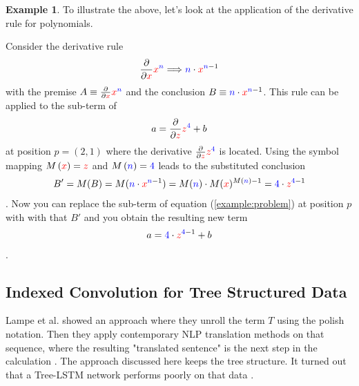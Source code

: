 \documentclass{scrartcl}
\theoremstyle{definition}
\newtheorem{exmp}{Example}[section]
\begin{document}
\begin{exmp}
To illustrate the above, let's look at the application of the derivative rule for polynomials.

Consider the derivative rule
\begin{align}
	\frac{\partial}{\partial {\color{red}x}} {\color{red}x}^{\color{blue}n} \Longrightarrow {\color{blue}n}\cdot {\color{red}x}^{{\color{blue}n}-1} 
\end{align}
with the premise $A\equiv \frac{\partial}{\partial {\color{red}x}} {\color{red}x}^{\color{blue}n}$ and the conclusion $B\equiv {\color{blue}n}\cdot {\color{red}x}^{{\color{blue}n}-1}$.
This rule can be applied to the sub-term of
\begin{align}
	a = \frac{\partial}{\partial {\color{red}z}} {\color{red}z}^{\color{blue}4} + b
	\label{example:problem}
\end{align}
at position $p=\left(2,1\right)$ where the derivative $\frac{\partial}{\partial {\color{red}z}} {\color{red}z}^{\color{blue}4}$ is located.
Using the symbol mapping $M\left({\color{red}x}\right) = \color{red}z$ and $M\left({\color{blue}n} \right) = {\color{blue}4}$ leads to the substituted conclusion
\begin{align}
B' = M(B) = M({\color{blue}n}\cdot {\color{red}x}^{{\color{blue}n}-1}) = {M(\color{blue}n})\cdot M({\color{red}x})^{M({\color{blue}n})-1} = {\color{blue}4}\cdot {\color{red}z}^{{\color{blue}4}-1}
\end{align}.
Now you can replace the sub-term of equation (\ref{example:problem}) at position $p$ with with that $B'$ and you obtain the resulting new term
\begin{align}
	a = {\color{blue}4}\cdot {\color{red}z}^{{\color{blue}4}-1} + b
\end{align}.

\end{exmp}

\subsection{Indexed Convolution for Tree Structured Data}

Lampe et al. showed an approach where they unroll the term $T$ using the polish notation.
Then they apply contemporary NLP translation methods on that sequence, where the resulting "translated sentence" is the next step in the calculation \cite{Lample2020Deep}.
The approach discussed here keeps the tree structure.
It turned out that a Tree-LSTM network performs poorly on that data \cite{tai2015improved}.
\end{document}
